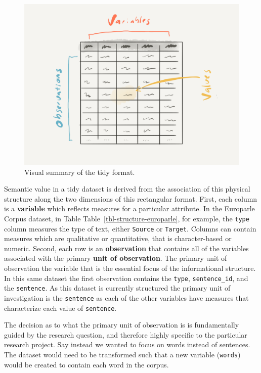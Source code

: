 \documentclass[
  letterpaper,
]{scrbook}
\begin{document}
\begin{figure}[h]

{\centering \includegraphics[width=7.2in,height=\textheight]{./figures/understanding-data/tidy-format-paper.png}

}

\caption{\label{fig-tidy-format-image}Visual summary of the tidy
format.}

\end{figure}

Semantic value in a tidy dataset is derived from the association of this
physical structure along the two dimensions of this rectangular format.
First, each column is a \textbf{variable} which reflects measures for a
particular attribute. In the Europarle Corpus dataset, in Table
Table~\ref{tbl-structure-europarle}, for example, the \texttt{type}
column measures the type of text, either \texttt{Source} or
\texttt{Target}. Columns can contain measures which are qualitative or
quantitative, that is character-based or numeric. Second, each row is an
\textbf{observation} that contains all of the variables associated with
the primary \textbf{unit of observation}. The primary unit of
observation the variable that is the essential focus of the
informational structure. In this same dataset the first observation
contains the \texttt{type}, \texttt{sentence\_id}, and the
\texttt{sentence}. As this dataset is currently structured the primary
unit of investigation is the \texttt{sentence} as each of the other
variables have measures that characterize each value of
\texttt{sentence}.

The decision as to what the primary unit of observation is is
fundamentally guided by the research question, and therefore highly
specific to the particular research project. Say instead we wanted to
focus on words instead of sentences. The dataset would need to be
transformed such that a new variable (\texttt{words}) would be created
to contain each word in the corpus.
\end{document}

